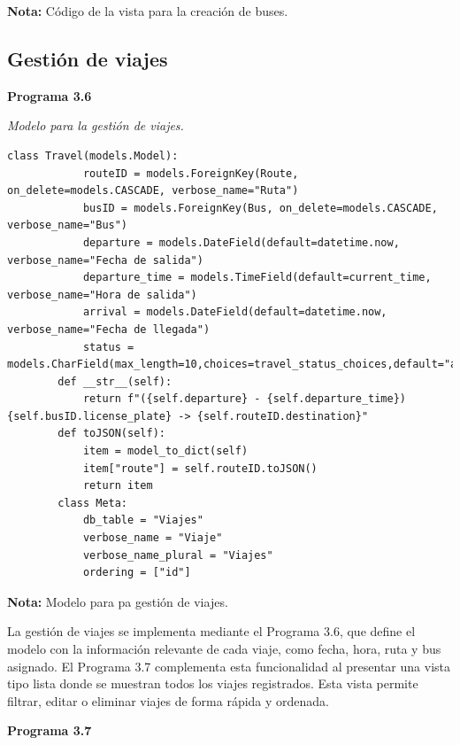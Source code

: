 	\textbf{Nota:} Código de la vista para la creación de buses.
	
	\subsection{Gestión de viajes}
	
	\textbf{Programa 3.6}
	
	\textit{Modelo para la gestión de viajes.} %
	\vspace{0.3cm} %
	\begin{lstlisting}[lineskip=-1pt]
		class Travel(models.Model):
			routeID = models.ForeignKey(Route, on_delete=models.CASCADE, verbose_name="Ruta")
			busID = models.ForeignKey(Bus, on_delete=models.CASCADE, verbose_name="Bus")
			departure = models.DateField(default=datetime.now, verbose_name="Fecha de salida")
			departure_time = models.TimeField(default=current_time, verbose_name="Hora de salida")
			arrival = models.DateField(default=datetime.now, verbose_name="Fecha de llegada")
			status = models.CharField(max_length=10,choices=travel_status_choices,default="active",verbose_name="Estado")		
		def __str__(self):
			return f"({self.departure} - {self.departure_time}) {self.busID.license_plate} -> {self.routeID.destination}"		
		def toJSON(self):
			item = model_to_dict(self)
			item["route"] = self.routeID.toJSON()
			return item		
		class Meta:
			db_table = "Viajes"
			verbose_name = "Viaje"
			verbose_name_plural = "Viajes"
			ordering = ["id"]
	\end{lstlisting}
	
	\textbf{Nota:} Modelo para pa gestión de viajes.
	
	La gestión de viajes se implementa mediante el Programa 3.6, que define el modelo con la información relevante de cada viaje, como fecha, hora, ruta y bus asignado. El Programa 3.7 complementa esta funcionalidad al presentar una vista tipo lista donde se muestran todos los viajes registrados. Esta vista permite filtrar, editar o eliminar viajes de forma rápida y ordenada.
	
	\textbf{Programa 3.7}
	
